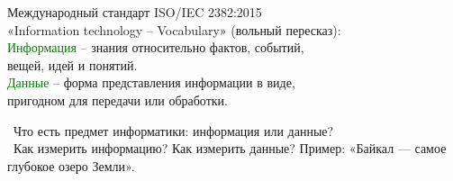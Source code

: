 \newpage
\rhead{\textbf{\textcolor{blue}{Т}\textcolor{gray}{ерминология: информация и данные}}}
\vspace*{2mm}
\newline
\begin{flushleft}
 Международный стандарт ISO/IEC 2382:2015\\
«Information technology – Vocabulary» (вольный пересказ):\\
\qquad \textcolor{Green}
{Информация} – знания относительно фактов, событий, \\ \qquad вещей, идей и  понятий.
\\
		\qquad \textcolor{Green}{Данные} – форма представления информации в виде, \\ \qquad пригодном для передачи или обработки. \\
\end{flushleft}
	\vspace*{3mm}
	\textbullet \ Что есть предмет информатики: информация или данные? \\
	\textbullet \ Как измерить информацию? Как измерить данные? 	Пример: «Байкал — самое глубокое озеро Земли».
	